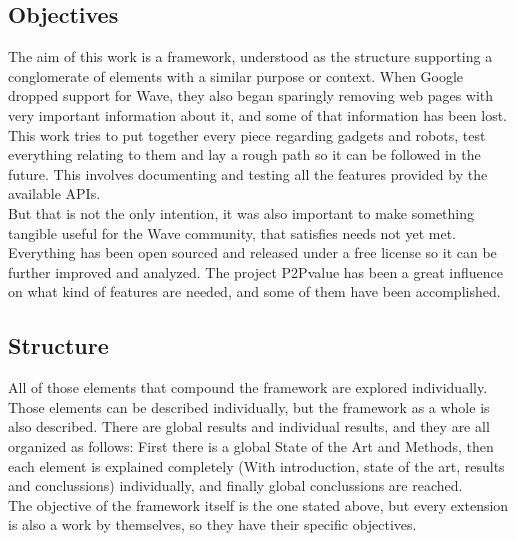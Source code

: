 \subsection{Objectives}
The aim of this work is a framework, understood as the structure supporting a conglomerate of elements with a similar purpose or context. When Google dropped support for Wave, they also began sparingly removing web pages with very important information about it, and some of that information has been lost. This work tries to put together every piece regarding gadgets and robots, test everything relating to them and lay a rough path so it can be followed in the future. This involves documenting and testing all the features provided by the available APIs.\\[.2cm]
But that is not the only intention, it was also important to make something tangible useful for the Wave community, that satisfies needs not yet met. Everything has been open sourced and released under a free license so it can be further improved and analyzed. The project P2Pvalue \cite{ref:p2pvalue} has been a great influence on what kind of features are needed, and some of them have been accomplished.

\subsection{Structure}
All of those elements that compound the framework are explored individually. Those elements can be described individually, but the framework as a whole is also described. There are global results and individual results, and they are all organized as follows: First there is a global State of the Art and Methods, then each element is explained completely (With introduction, state of the art, results and conclussions) individually, and finally global conclussions are reached.\\[.2cm]
The objective of the framework itself is the one stated above, but every extension is also a work by themselves, so they have their specific objectives.
